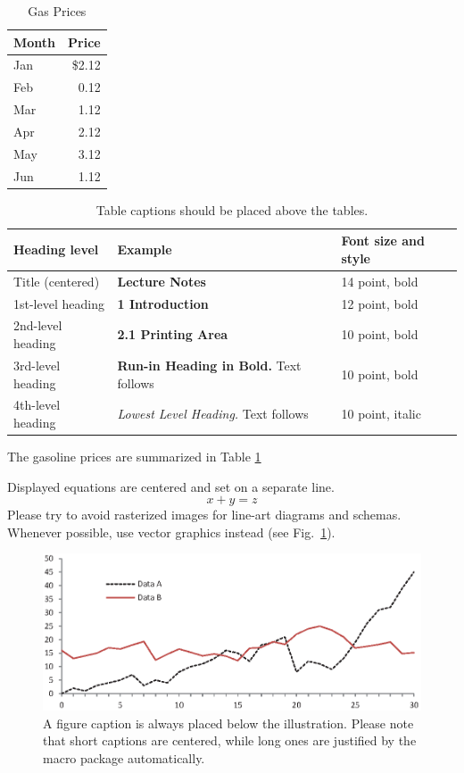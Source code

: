\documentclass[runningheads]{llncs}
\begin{document}
\begin{table}
\caption{Gas Prices}\label{gasprice}
\begin{tabular}{|l|r|}
\hline
Month &  Price \\
\hline
Jan &  \$2.12 \\
Feb &  0.12 \\
Mar &  1.12 \\
Apr &  2.12 \\
May &  3.12 \\
Jun &  1.12 \\

\hline
\end{tabular}
\end{table}



\begin{table}
\caption{Table captions should be placed above the
tables.}\label{tab1}
\begin{tabular}{|l|l|l|}
\hline
Heading level &  Example & Font size and style\\
\hline
Title (centered) &  {\Large\bfseries Lecture Notes} & 14 point, bold\\
1st-level heading &  {\large\bfseries 1 Introduction} & 12 point, bold\\
2nd-level heading & {\bfseries 2.1 Printing Area} & 10 point, bold\\
3rd-level heading & {\bfseries Run-in Heading in Bold.} Text follows & 10 point, bold\\
4th-level heading & {\itshape Lowest Level Heading.} Text follows & 10 point, italic\\
\hline
\end{tabular}
\end{table}


The gasoline prices are summarized in Table \ref{gasprice}



\noindent Displayed equations are centered and set on a separate
line.
\begin{equation}
x + y = z
\end{equation}
Please try to avoid rasterized images for line-art diagrams and
schemas. Whenever possible, use vector graphics instead (see
Fig.~\ref{fig1}).

\begin{figure}
\includegraphics[width=\textwidth]{fig1.eps}
\caption{A figure caption is always placed below the illustration.
Please note that short captions are centered, while long ones are
justified by the macro package automatically.} 
\label{fig1}
\end{figure}
\end{document}
